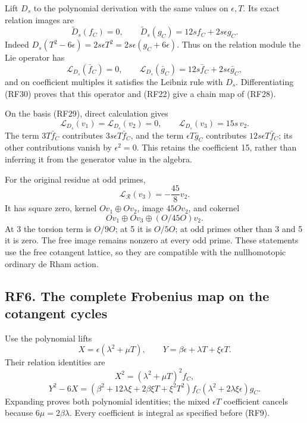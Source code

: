 \documentclass[
  10pt,
]{article}
\begin{document}
Lift \(D_s\) to the polynomial derivation with the same values on
\(\epsilon,T\). Its exact relation images are \[
\widetilde D_s(f_C)=0,\qquad
\widetilde D_s(g_C)=12s f_C+2s\epsilon g_C.
\tag{RF30}
\] Indeed
\(D_s(T^2-6\epsilon)=2s\epsilon T^2=2s\epsilon(g_C+6\epsilon)\). Thus on
the relation module the Lie operator has \[
\mathcal L_{D_s}(\bar f_C)=0,\qquad
\mathcal L_{D_s}(\bar g_C)=12s\bar f_C+2s\epsilon\bar g_C,
\] and on coefficient multiples it satisfies the Leibniz rule with
\(D_s\). Differentiating (RF30) proves that this operator and (RF22)
give a chain map of (RF28).

On the basis (RF29), direct calculation gives \[
\mathcal L_{D_s}(v_1)=\mathcal L_{D_s}(v_2)=0,\qquad
\mathcal L_{D_s}(v_3)=15s\,v_2.
\tag{RF31}
\] The term \(3T\bar f_C\) contributes \(3s\epsilon T\bar f_C\), and the
term \(\epsilon T\bar g_C\) contributes \(12s\epsilon T\bar f_C\); its
other contributions vanish by \(\epsilon^2=0\). This retains the
coefficient 15, rather than inferring it from the generator value in the
algebra.

For the original residue at odd primes, \[
\mathcal L_{\mathcal R}(v_3)=-\frac{45}{8}v_2.
\tag{RF32}
\] It has square zero, kernel \(Ov_1\oplus Ov_2\), image \(45Ov_2\), and
cokernel \[
Ov_1\oplus Ov_3\oplus(O/45O)v_2.
\tag{RF33}
\] At 3 the torsion term is \(O/9O\); at 5 it is \(O/5O\); at odd primes
other than 3 and 5 it is zero. The free image remains nonzero at every
odd prime. These statements use the free cotangent lattice, so they are
compatible with the nullhomotopic ordinary de Rham action.

\subsection{RF6. The complete Frobenius map on the cotangent
cycles}\label{rf6.-the-complete-frobenius-map-on-the-cotangent-cycles}

Use the polynomial lifts \[
X=\epsilon(\lambda^2+\mu T),\qquad
Y=\beta\epsilon+\lambda T+\xi\epsilon T.
\] Their relation identities are \[
X^2=(\lambda^2+\mu T)^2 f_C,
\] \[
Y^2-6X=
\left(\beta^2+12\lambda\xi+2\beta\xi T+\xi^2T^2\right)f_C
\left(\lambda^2+2\lambda\xi\epsilon\right)g_C.
\tag{RF34}
\] Expanding proves both polynomial identities; the mixed \(\epsilon T\)
coefficient cancels because \(6\mu=2\beta\lambda\). Every coefficient is
integral as specified before (RF9).
\end{document}
